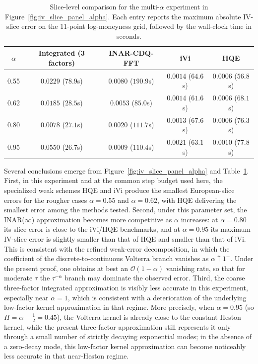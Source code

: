 \documentclass[letterpaper]{article}
\numberwithin{equation}{section}
\theoremstyle{definition}
\theoremstyle{remark}
\begin{document}
\begin{table}[ht]
\centering
\caption{Slice-level comparison for the multi-$\alpha$ experiment in Figure~\ref{fig:iv_slice_panel_alpha}. Each entry reports the maximum absolute IV-slice error on the 11-point log-moneyness grid, followed by the wall-clock time in seconds.}
\label{tab:iv_slice_panel_alpha}
\small
\setlength{\tabcolsep}{5pt}
\begin{tabular}{ccccc}
\toprule
$\alpha$ & Integrated (3 factors) & INAR-CDQ-FFT & iVi & HQE \\
\midrule
0.55 & $0.0229$ ($78.9$s) & $0.0080$ ($190.9$s) & $0.0014$ ($64.6$s) & $0.0006$ ($56.8$s) \\
0.62 & $0.0185$ ($28.5$s) & $0.0053$ ($85.0$s)  & $0.0014$ ($61.6$s) & $0.0006$ ($68.1$s) \\
0.80 & $0.0078$ ($27.1$s) & $0.0020$ ($111.7$s) & $0.0013$ ($67.6$s) & $0.0006$ ($76.3$s) \\
0.95 & $0.0550$ ($26.7$s) & $0.0009$ ($110.4$s) & $0.0021$ ($63.1$s) & $0.0010$ ($77.8$s) \\
\bottomrule
\end{tabular}
\end{table}

Several conclusions emerge from Figure~\ref{fig:iv_slice_panel_alpha} and Table~\ref{tab:iv_slice_panel_alpha}. First, in this experiment and at the common step budget used here, the specialized weak schemes HQE and iVi produce the smallest European-slice errors for the rougher cases $\alpha=0.55$ and $\alpha=0.62$, with HQE delivering the smallest error among the methods tested. Second, under this parameter set, the INAR($\infty$) approximation becomes more competitive as $\alpha$ increases: at $\alpha=0.80$ its slice error is close to the iVi/HQE benchmarks, and at $\alpha=0.95$ its maximum IV-slice error is slightly smaller than that of HQE and smaller than that of iVi. This is consistent with the refined weak-error decomposition, in which the coefficient of the discrete-to-continuous Volterra branch vanishes as $\alpha\uparrow1^-$. Under the present proof, one obtains at best an $\mathcal O(1-\alpha)$ vanishing rate, so that for moderate $\tau$ the $\tau^{-\alpha}$ branch may dominate the observed error. Third, the coarse three-factor integrated approximation is visibly less accurate in this experiment, especially near $\alpha=1$, which is consistent with a deterioration of the underlying low-factor kernel approximation in that regime. More precisely, when $\alpha=0.95$ (so $H=\alpha-\tfrac12=0.45$), the Volterra kernel is already close to the constant Heston kernel, while the present three-factor approximation still represents it only through a small number of strictly decaying exponential modes; in the absence of a zero-decay mode, this low-factor kernel approximation can become noticeably less accurate in that near-Heston regime.
\end{document}
